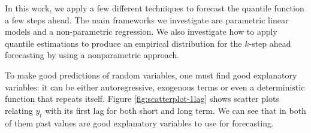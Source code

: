 In this work, we apply a few different techniques to forecast the quantile function a few steps ahead. The main frameworks we investigate are parametric linear models and a non-parametric regression. We also investigate how to apply quantile estimations to produce an empirical distribution for the $k$-step ahead forecasting by using a nonparametric approach.


To make good predictions of random variables, one must find good explanatory variables: it can be either autoregressive, exogenous terms or even a deterministic function that repeats itself.
Figure \ref{fig:scatterplot-1lag} shows scatter plots relating $y_t$ with its first lag for both short and long term. We can see that in both of them past values are good explanatory variables to use for forecasting.

